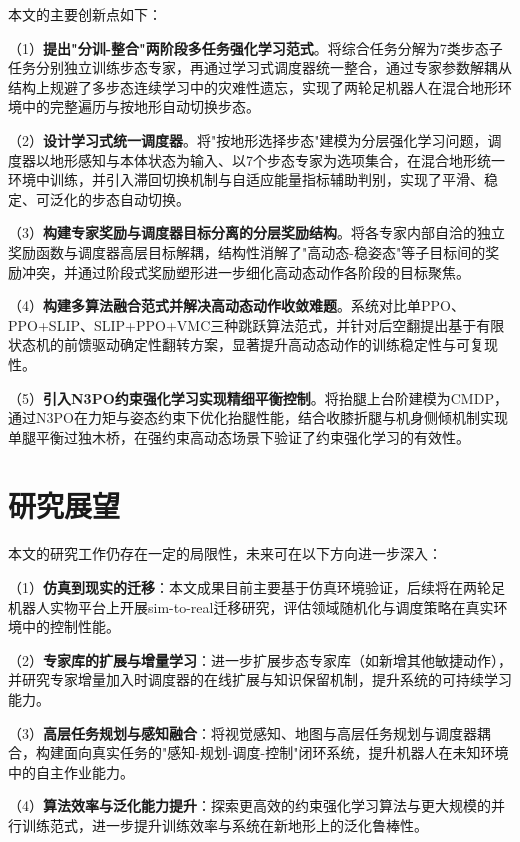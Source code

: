本文的主要创新点如下：

（1）\textbf{提出"分训-整合"两阶段多任务强化学习范式}。将综合任务分解为7类步态子任务分别独立训练步态专家，再通过学习式调度器统一整合，通过专家参数解耦从结构上规避了多步态连续学习中的灾难性遗忘，实现了两轮足机器人在混合地形环境中的完整遍历与按地形自动切换步态。

（2）\textbf{设计学习式统一调度器}。将"按地形选择步态"建模为分层强化学习问题，调度器以地形感知与本体状态为输入、以7个步态专家为选项集合，在混合地形统一环境中训练，并引入滞回切换机制与自适应能量指标辅助判别，实现了平滑、稳定、可泛化的步态自动切换。

（3）\textbf{构建专家奖励与调度器目标分离的分层奖励结构}。将各专家内部自洽的独立奖励函数与调度器高层目标解耦，结构性消解了"高动态-稳姿态"等子目标间的奖励冲突，并通过阶段式奖励塑形进一步细化高动态动作各阶段的目标聚焦。

（4）\textbf{构建多算法融合范式并解决高动态动作收敛难题}。系统对比单PPO、PPO+SLIP、SLIP+PPO+VMC三种跳跃算法范式，并针对后空翻提出基于有限状态机的前馈驱动确定性翻转方案，显著提升高动态动作的训练稳定性与可复现性。

（5）\textbf{引入N3PO约束强化学习实现精细平衡控制}。将抬腿上台阶建模为CMDP，通过N3PO在力矩与姿态约束下优化抬腿性能，结合收膝折腿与机身侧倾机制实现单腿平衡过独木桥，在强约束高动态场景下验证了约束强化学习的有效性。

\section{研究展望}

本文的研究工作仍存在一定的局限性，未来可在以下方向进一步深入：

（1）\textbf{仿真到现实的迁移}：本文成果目前主要基于仿真环境验证，后续将在两轮足机器人实物平台上开展sim-to-real迁移研究，评估领域随机化与调度策略在真实环境中的控制性能。

（2）\textbf{专家库的扩展与增量学习}：进一步扩展步态专家库（如新增其他敏捷动作），并研究专家增量加入时调度器的在线扩展与知识保留机制，提升系统的可持续学习能力。

（3）\textbf{高层任务规划与感知融合}：将视觉感知、地图与高层任务规划与调度器耦合，构建面向真实任务的"感知-规划-调度-控制"闭环系统，提升机器人在未知环境中的自主作业能力。

（4）\textbf{算法效率与泛化能力提升}：探索更高效的约束强化学习算法与更大规模的并行训练范式，进一步提升训练效率与系统在新地形上的泛化鲁棒性。
